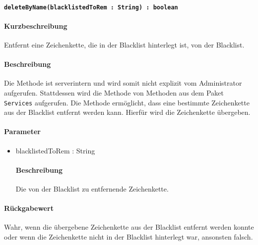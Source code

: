 \paragraph{\texttt{deleteByName(blacklistedToRem : String) : boolean}}%
\paragraph*{Kurzbeschreibung}
Entfernt eine Zeichenkette, die in der Blacklist hinterlegt ist, von der Blacklist.
\paragraph*{Beschreibung}
Die Methode ist serverintern und wird somit nicht explizit vom Administrator aufgerufen.
Stattdessen wird die Methode von Methoden aus dem Paket \texttt{Services} aufgerufen.
Die Methode ermöglicht, dass eine bestimmte Zeichenkette aus der Blacklist entfernt werden kann.
Hierfür wird die Zeichenkette übergeben.
\paragraph*{Parameter}
\begin{itemize}
    \item blacklistedToRem : String
    		\paragraph*{Beschreibung}
    		Die von der Blacklist zu entfernende Zeichenkette.
\end{itemize}
\paragraph*{Rückgabewert}
Wahr, wenn die übergebene Zeichenkette aus der Blacklist entfernt werden konnte oder wenn die Zeichenkette nicht in der Blacklist hinterlegt war, ansonsten falsch.
